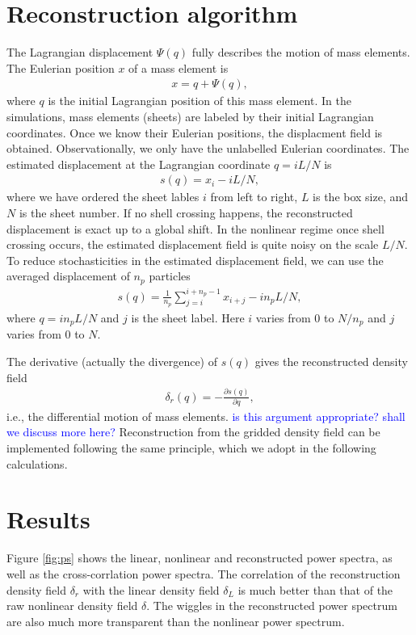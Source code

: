 \documentclass[aps,prd,twocolumn,showpacs,superscriptaddress,groupedaddress,nofootinbib]{revtex4}  %
\newcommand{\tcb}{\textcolor{blue}}
\newcommand{\bea}{\begin{eqnarray}}
\newcommand{\eea}{\end{eqnarray}}
\begin{document}
\section{Reconstruction algorithm}
The Lagrangian displacement 
${\Psi}({q})$ fully describes the motion of mass elements.
The Eulerian position ${x}$ of a mass element is
\bea
{x}={q}+{\Psi}({q}),
\eea
where ${q}$ is the initial Lagrangian position of this mass element.
In the simulations, mass elements (sheets) are labeled by their initial 
Lagrangian coordinates. Once we know their Eulerian positions, the displacment 
field is obtained. Observationally, we only have the unlabelled Eulerian 
coordinates. 
The estimated displacement at the Lagrangian coordinate $q=iL/N$ is 
\bea
s(q)=x_i-iL/N,
\eea
where we have ordered the sheet lables $i$ from left to right, $L$ is the box
size, and $N$ is the sheet number. 
If no shell crossing happens, the reconstructed displacement is exact up to
a global shift. In the nonlinear regime once shell crossing occurs, the 
estimated displacement field is quite noisy on the scale $L/N$.
To reduce stochasticities in the estimated displacement field, we can use the
averaged displacement of $n_p$ particles 
\bea
s(q)=\frac{1}{n_p}\sum_{j=i}^{i+n_p-1}x_{i+j}-in_pL/N,
\eea
where $q=in_pL/N$ and $j$ is the sheet label. 
Here $i$ varies from $0$ to $N/n_p$ and $j$ varies from $0$ to $N$.

The derivative (actually the divergence) of $s(q)$ gives the reconstructed 
density field 
\bea
\delta_r({q})=-\frac{\partial s(q)}{\partial q},
\eea
i.e., the differential
motion of mass elements. \tcb{is this argument appropriate? shall we discuss 
more here?}
Reconstruction from the gridded density field can be implemented following
the same principle, which we adopt in the following calculations.


\section{Results}
Figure \ref{fig:ps} shows the linear, nonlinear and reconstructed power spectra,
as well as the cross-corrlation power spectra.
The correlation of the reconstruction density field $\delta_r$ with the linear
density field $\delta_L$ is much better than that of the raw nonlinear density 
field $\delta$. The wiggles in the reconstructed power spectrum are also much 
more transparent than the nonlinear power spectrum.
\end{document}
